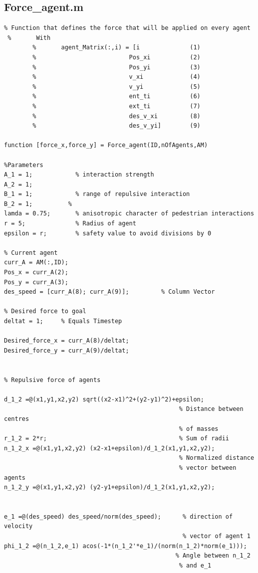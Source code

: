 \documentclass[11pt]{article}
\begin{document}
\subsection*{Force\_agent.m}
\begin{lstlisting}[frame= lines]
%Agent force Function
% Function that defines the force that will be applied on every agent
 %       With        
        %       agent_Matrix(:,i) = [i              (1)
        %                          Pos_xi           (2)
        %                          Pos_yi           (3)
        %                          v_xi             (4)
        %                          v_yi             (5)
        %                          ent_ti           (6)
        %                          ext_ti           (7)
        %                          des_v_xi         (8)
        %                          des_v_yi]        (9)
        
function [force_x,force_y] = Force_agent(ID,nOfAgents,AM)

%Parameters
A_1 = 1;            % interaction strength
A_2 = 1; 
B_1 = 1;            % range of repulsive interaction
B_2 = 1;          %
lamda = 0.75;       % anisotropic character of pedestrian interactions
r = 5;              % Radius of agent
epsilon = r;        % safety value to avoid divisions by 0

% Current agent
curr_A = AM(:,ID);
Pos_x = curr_A(2);
Pos_y = curr_A(3);
des_speed = [curr_A(8); curr_A(9)];         % Column Vector

% Desired force to goal
deltat = 1;     % Equals Timestep

Desired_force_x = curr_A(8)/deltat;
Desired_force_y = curr_A(9)/deltat;


% Repulsive force of agents

d_1_2 =@(x1,y1,x2,y2) sqrt((x2-x1)^2+(y2-y1)^2)+epsilon;
                                                 % Distance between centres 
                                                 % of masses
r_1_2 = 2*r;                                     % Sum of radii
n_1_2_x =@(x1,y1,x2,y2) (x2-x1+epsilon)/d_1_2(x1,y1,x2,y2);
                                                 % Normalized distance 
                                                 % vector between agents
n_1_2_y =@(x1,y1,x2,y2) (y2-y1+epsilon)/d_1_2(x1,y1,x2,y2);


e_1 =@(des_speed) des_speed/norm(des_speed);      % direction of velocity
                                                  % vector of agent 1 
phi_1_2 =@(n_1_2,e_1) acos(-1*(n_1_2'*e_1)/(norm(n_1_2)*norm(e_1)));
                                                % Angle between n_1_2 
                                                 % and e_1


\end{lstlisting}
\end{document}
